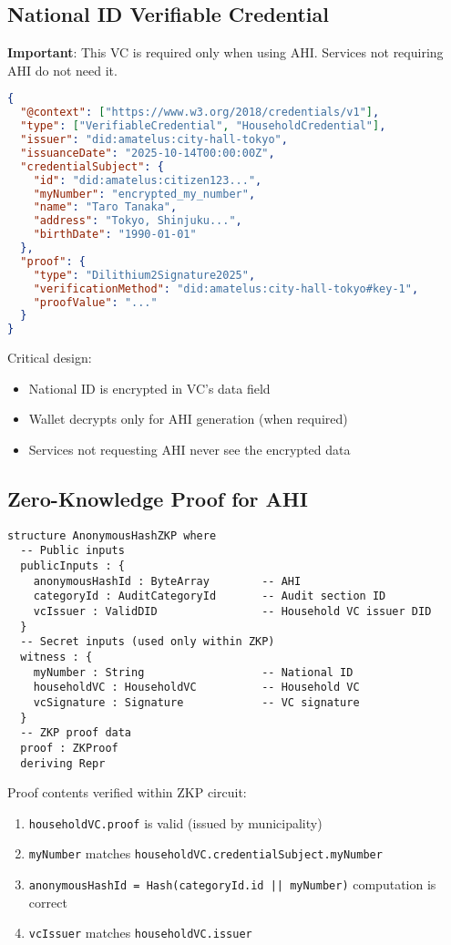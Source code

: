 \subsection{National ID Verifiable Credential}

\textbf{Important}: This VC is required only when using AHI. Services not requiring AHI do not need it.

\begin{lstlisting}[language=json]
{
  "@context": ["https://www.w3.org/2018/credentials/v1"],
  "type": ["VerifiableCredential", "HouseholdCredential"],
  "issuer": "did:amatelus:city-hall-tokyo",
  "issuanceDate": "2025-10-14T00:00:00Z",
  "credentialSubject": {
    "id": "did:amatelus:citizen123...",
    "myNumber": "encrypted_my_number",
    "name": "Taro Tanaka",
    "address": "Tokyo, Shinjuku...",
    "birthDate": "1990-01-01"
  },
  "proof": {
    "type": "Dilithium2Signature2025",
    "verificationMethod": "did:amatelus:city-hall-tokyo#key-1",
    "proofValue": "..."
  }
}
\end{lstlisting}

Critical design:
\begin{itemize}
  \item National ID is encrypted in VC's data field
  \item Wallet decrypts only for AHI generation (when required)
  \item Services not requesting AHI never see the encrypted data
\end{itemize}

\subsection{Zero-Knowledge Proof for AHI}

\begin{lstlisting}[language=Lean]
structure AnonymousHashZKP where
  -- Public inputs
  publicInputs : {
    anonymousHashId : ByteArray        -- AHI
    categoryId : AuditCategoryId       -- Audit section ID
    vcIssuer : ValidDID                -- Household VC issuer DID
  }
  -- Secret inputs (used only within ZKP)
  witness : {
    myNumber : String                  -- National ID
    householdVC : HouseholdVC          -- Household VC
    vcSignature : Signature            -- VC signature
  }
  -- ZKP proof data
  proof : ZKProof
  deriving Repr
\end{lstlisting}

Proof contents verified within ZKP circuit:
\begin{enumerate}
  \item \texttt{householdVC.proof} is valid (issued by municipality)
  \item \texttt{myNumber} matches \texttt{householdVC.credentialSubject.myNumber}
  \item \texttt{anonymousHashId = Hash(categoryId.id || myNumber)} computation is correct
  \item \texttt{vcIssuer} matches \texttt{householdVC.issuer}
\end{enumerate}

